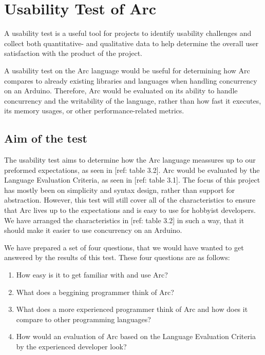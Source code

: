 \section{Usability Test of Arc}\label{subsec:usabilityTestOfArc}

A usability test is a useful tool for projects to identify usability challenges and collect both quantitative- and qualitative data to help determine the overall user satisfaction with the product of the project.

A usability test on the Arc language would be useful for determining how Arc compares to already existing libraries and languages when handling concurrency on an Arduino. Therefore, Arc would be evaluated on its ability to handle concurrency and the writability of the language, rather than how fast it executes, its memory usages, or other performance-related metrics.

\subsection{Aim of the test}\label{subsubsec:aimOfTheTest}

The usability test aims to determine how the Arc language meassures up to our preformed expectations, as seen in [ref: table 3.2]. Arc would be evaluated by the Language Evaluation Criteria, as seen in [ref: table 3.1]. The focus of this project has mostly been on simplicity and syntax design, rather than support for abstraction. However, this test will still cover all of the characteristics to ensure that Arc lives up to the expectations and is easy to use for hobbyist developers. We have arranged the characteristics in [ref: table 3.2] in such a way, that it should make it easier to use concurrency on an Arduino.

We have prepared a set of four questions, that we would have wanted to get answered by the results of this test. These four questions are as follows:

\begin{enumerate}
    \item How easy is it to get familiar with and use Arc?
    \item What does a beggining programmer think of Arc?
    \item What does a more experienced programmer think of Arc and how does it compare to other programming languages?
    \item How would an evaluation of Arc based on the Language Evaluation Criteria by the experienced developer look?
\end{enumerate}

